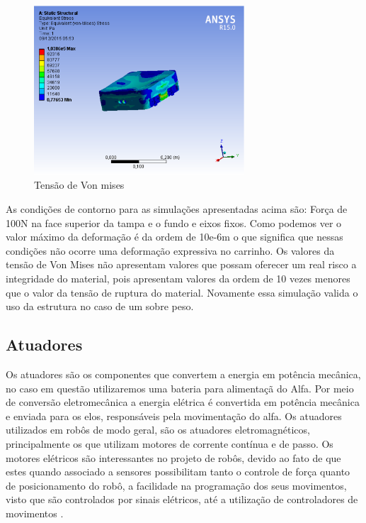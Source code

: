 \begin{figure}[H]
    \centering
    \includegraphics[width=0.7\textwidth]{figuras/sobrepeso_von.eps}
    \caption{Tensão de Von mises}
    \label{fig:sobrepeso_von}
\end{figure}

As condições de contorno para as simulações apresentadas acima são: Força de 100N na face superior da tampa e o fundo e eixos fixos. 
Como podemos ver o valor máximo da deformação é da ordem de 10e-6m o que significa que nessas condições não ocorre uma deformação expressiva
no carrinho. Os valores da tensão de Von Mises não apresentam valores que possam oferecer um real risco a integridade do material, pois
apresentam valores da ordem de 10 vezes menores que o valor da tensão de ruptura do material. Novamente essa simulação valida o uso da
estrutura no caso de um sobre peso.

\subsection{Atuadores}

Os atuadores são os componentes que convertem a energia em potência mecânica, no caso em questão utilizaremos uma bateria para alimentaçã
 do Alfa. Por meio de conversão eletromecânica a energia elétrica é convertida em potência mecânica e enviada para os elos, responsáveis
 pela movimentação do alfa.  Os atuadores utilizados em robôs de modo geral, são os atuadores eletromagnéticos, principalmente os que
 utilizam motores de corrente contínua e de passo. Os motores elétricos são interessantes no projeto de robôs, devido ao fato de que estes
 quando associado a sensores possibilitam tanto o controle de força quanto de posicionamento do robô, a facilidade na programação dos seus
 movimentos, visto que são controlados por sinais elétricos, até a utilização de controladores de movimentos \cite{romano:2002}.

